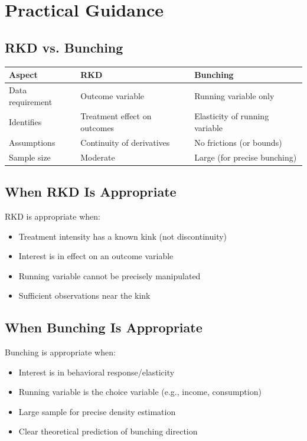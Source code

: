 \section{Practical Guidance}
\label{sec:kink_practical}

\subsection{RKD vs. Bunching}

\begin{center}
\begin{tabular}{lll}
\toprule
\textbf{Aspect} & \textbf{RKD} & \textbf{Bunching} \\
\midrule
Data requirement & Outcome variable & Running variable only \\
Identifies & Treatment effect on outcomes & Elasticity of running variable \\
Assumptions & Continuity of derivatives & No frictions (or bounds) \\
Sample size & Moderate & Large (for precise bunching) \\
\bottomrule
\end{tabular}
\end{center}

\subsection{When RKD Is Appropriate}

RKD is appropriate when:
\begin{itemize}
    \item Treatment intensity has a known kink (not discontinuity)
    \item Interest is in effect on an outcome variable
    \item Running variable cannot be precisely manipulated
    \item Sufficient observations near the kink
\end{itemize}

\subsection{When Bunching Is Appropriate}

Bunching is appropriate when:
\begin{itemize}
    \item Interest is in behavioral response/elasticity
    \item Running variable is the choice variable (e.g., income, consumption)
    \item Large sample for precise density estimation
    \item Clear theoretical prediction of bunching direction
\end{itemize}

